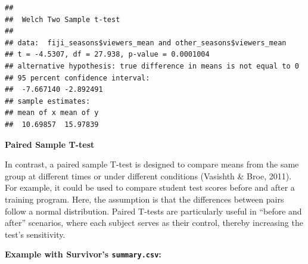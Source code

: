 \documentclass[
  b5paper]{book}
\newenvironment{Shaded}{\begin{snugshade}}{\end{snugshade}}
\newcommand{\AttributeTok}[1]{\textcolor[rgb]{0.13,0.29,0.53}{#1}}
\newcommand{\CommentTok}[1]{\textcolor[rgb]{0.56,0.35,0.01}{\textit{#1}}}
\newcommand{\ConstantTok}[1]{\textcolor[rgb]{0.56,0.35,0.01}{#1}}
\newcommand{\FunctionTok}[1]{\textcolor[rgb]{0.13,0.29,0.53}{\textbf{#1}}}
\newcommand{\NormalTok}[1]{#1}
\newcommand{\OtherTok}[1]{\textcolor[rgb]{0.56,0.35,0.01}{#1}}
\newcommand{\SpecialCharTok}[1]{\textcolor[rgb]{0.81,0.36,0.00}{\textbf{#1}}}
\newcommand{\StringTok}[1]{\textcolor[rgb]{0.31,0.60,0.02}{#1}}
\begin{document}
\begin{Shaded}
\end{Shaded}

\begin{verbatim}
## 
##  Welch Two Sample t-test
## 
## data:  fiji_seasons$viewers_mean and other_seasons$viewers_mean
## t = -4.5307, df = 27.938, p-value = 0.0001004
## alternative hypothesis: true difference in means is not equal to 0
## 95 percent confidence interval:
##  -7.667140 -2.892491
## sample estimates:
## mean of x mean of y 
##  10.69857  15.97839
\end{verbatim}

\textbf{Paired Sample T-test}

In contrast, a paired sample T-test is designed to compare means from the same group at different times or under different conditions (Vasishth \& Broe, 2011). For example, it could be used to compare student test scores before and after a training program. Here, the assumption is that the differences between pairs follow a normal distribution. Paired T-tests are particularly useful in ``before and after'' scenarios, where each subject serves as their control, thereby increasing the test's sensitivity.

\textbf{Example with Survivor's \texttt{summary.csv}:}

\begin{Shaded}
\end{Shaded}
\end{document}

